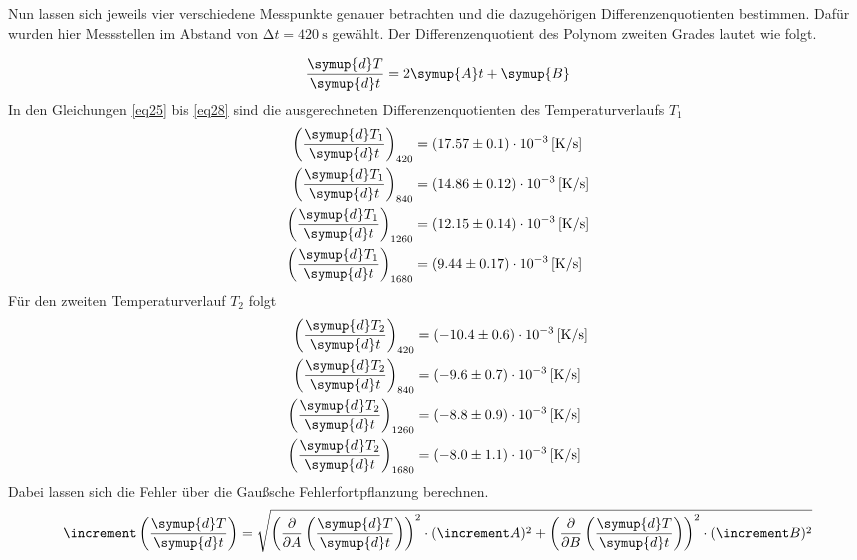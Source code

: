 \begin{flushleft}
Nun lassen sich jeweils vier verschiedene Messpunkte genauer betrachten und die dazugehörigen Differenzenquotienten bestimmen. Dafür wurden hier
Messstellen im Abstand von $\increment t = \SI{420}{\second}$ gewählt.
Der Differenzenquotient des Polynom zweiten Grades lautet wie folgt.
\end{flushleft}
\begin{equation}
\frac{\symup{d}T}{\symup{d}t} = 2 \symup{A} t + \symup{B}
\end{equation}
In den Gleichungen \eqref{eq25} bis \eqref{eq28} sind die ausgerechneten Differenzenquotienten des Temperaturverlaufs $T_{1}$
\begin{align}
\left( \frac{\symup{d}T_{1}}{\symup{d}t}\right)_{420} &= (17.57\pm0.1)\cdot 10^{-3} \, \text{[K/s]} \label{eq25}\\
\left(\frac{\symup{d}T_{1}}{\symup{d}t}\right)_{840} &= (14.86\pm0.12)\cdot 10^{-3} \,\text{[K/s]}\\
\left(\frac{\symup{d}T_{1}}{\symup{d}t}\right)_{1260} &= (12.15\pm0.14)\cdot 10^{-3} \, \text{[K/s]}\\
\left(\frac{\symup{d}T_{1}}{\symup{d}t}\right)_{1680} &= (9.44\pm0.17)\cdot 10^{-3} \, \text{[K/s]} \label{eq28}
\end{align}
Für den zweiten Temperaturverlauf $T_{2}$ folgt
\begin{align}
\left( \frac{\symup{d}T_{2}}{\symup{d}t}\right)_{420} &= (-10.4\pm0.6)\cdot 10^{-3} \, \text{[K/s]} \label{eq29}\\
\left(\frac{\symup{d}T_{2}}{\symup{d}t}\right)_{840} &= (-9.6\pm0.7)\cdot 10^{-3} \,\text{[K/s]}\\
\left(\frac{\symup{d}T_{2}}{\symup{d}t}\right)_{1260} &= (-8.8\pm0.9)\cdot 10^{-3} \, \text{[K/s]}\\
\left(\frac{\symup{d}T_{2}}{\symup{d}t}\right)_{1680} &= (-8.0\pm1.1)\cdot 10^{-3} \, \text{[K/s]} \label{eq32}
\end{align}
Dabei lassen sich die Fehler über die Gaußsche Fehlerfortpflanzung berechnen.
\begin{equation}
  \increment \left( \frac{\symup{d}T}{\symup{d}t}\right) = \sqrt{\left( \frac{\partial}{\partial A} \left( \frac{\symup{d}T}{\symup{d}t} \right)\right)^{2} \cdot (\increment A)^{2} + \left( \frac{\partial}{\partial B} \left( \frac{\symup{d}T}{\symup{d}t} \right)\right)^{2} \cdot (\increment B)^{2} }
  \label{eqn:gaussianmistake}
\end{equation}
